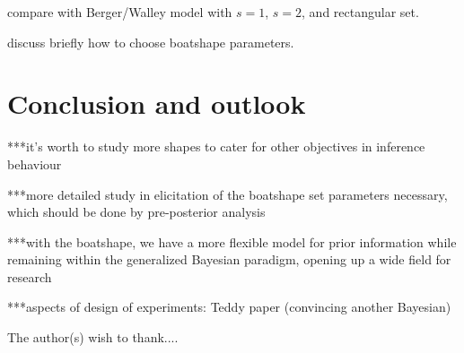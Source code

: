 compare with Berger/Walley model with $s=1$, $s=2$, and rectangular set.

discuss briefly how to choose boatshape parameters.


\section{Conclusion and outlook}

***it's worth to study more shapes to cater for other objectives in inference behaviour

***more detailed study in elicitation of the boatshape set parameters necessary,
which should be done by pre-posterior analysis

***with the boatshape, we have a more flexible model for prior information
while remaining within the generalized Bayesian paradigm,
opening up a wide field for research

***aspects of design of experiments: Teddy paper (convincing another Bayesian)








\begin{acknowledgement}
  The author(s) wish to thank....
\end{acknowledgement}

